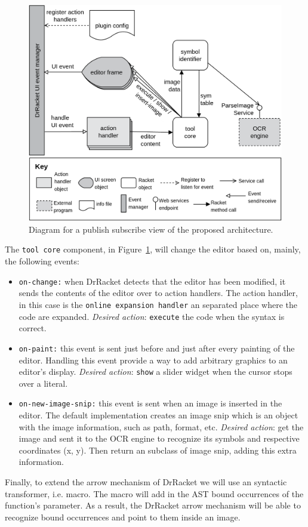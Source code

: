 \begin{figure}[htb]
	\centering
	\includegraphics[scale=0.19]{img/solution}
	\caption{Diagram for a publish subscribe view of the proposed architecture.}
	\label{fig:solution}
\end{figure}

The \texttt{tool core} component, in Figure~\ref{fig:solution}, will change the editor based on, mainly, the following events:

\begin{itemize}
	\item \texttt{on-change:} when DrRacket detects that the editor has been modified, it sends the contents of the editor over to action handlers.
	The action handler, in this case is the \texttt{online expansion handler} an separated place where the code are expanded. \textit{Desired action}: \texttt{execute} the code when the syntax is correct. 

	\item \texttt{on-paint:} this event is sent just before and just after every painting of the editor. Handling this event provide a way to add arbitrary graphics to an editor's display. \textit{Desired action}: \texttt{show} a slider widget when the cursor stops over a literal.

	\item \texttt{on-new-image-snip:} this event is sent when an image is inserted in the editor. The default implementation creates an image snip which is an object with the image information, such as path, format, etc. \textit{Desired action}: get the image and sent it to the OCR engine to recognize its symbols and respective coordinates (x, y). Then return an subclass of image snip, adding this extra information.
\end{itemize}

Finally, to extend the arrow mechanism of DrRacket we will use an syntactic transformer, i.e. macro. The macro will add in the AST bound occurrences of the function's parameter. As a result, the DrRacket arrow mechanism will be able to recognize bound occurrences and point to them inside an image.